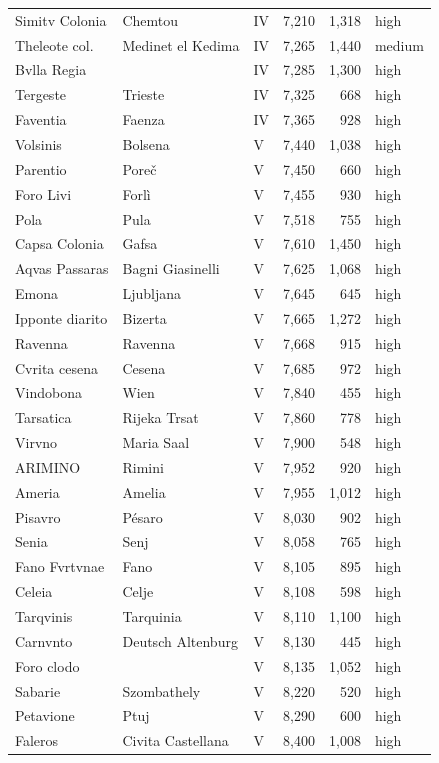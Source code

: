 \documentclass[11pt,a4paper]{article}
\begin{document}
{\begin{longtable}{p{4.6cm}p{5.2cm}lrrl}
Simitv Colonia & Chemtou & IV & 7,210 & 1,318 & high\\
Theleote col. & Medinet el Kedima & IV & 7,265 & 1,440 & medium\\
Bvlla Regia &  & IV & 7,285 & 1,300 & high\\
Tergeste & Trieste & IV & 7,325 & 668 & high\\
Faventia & Faenza & IV & 7,365 & 928 & high\\
Volsinis & Bolsena & V & 7,440 & 1,038 & high\\
Parentio & Poreč & V & 7,450 & 660 & high\\
Foro Livi & Forlì & V & 7,455 & 930 & high\\
Pola & Pula & V & 7,518 & 755 & high\\
Capsa Colonia & Gafsa & V & 7,610 & 1,450 & high\\
Aqvas Passaras & Bagni Giasinelli & V & 7,625 & 1,068 & high\\
Emona & Ljubljana & V & 7,645 & 645 & high\\
Ipponte diarito & Bizerta & V & 7,665 & 1,272 & high\\
Ravenna & Ravenna & V & 7,668 & 915 & high\\
Cvrita cesena & Cesena & V & 7,685 & 972 & high\\
Vindobona & Wien & V & 7,840 & 455 & high\\
Tarsatica & Rijeka Trsat & V & 7,860 & 778 & high\\
Virvno & Maria Saal & V & 7,900 & 548 & high\\
ARIMINO & Rimini & V & 7,952 & 920 & high\\
Ameria & Amelia & V & 7,955 & 1,012 & high\\
Pisavro & Pésaro & V & 8,030 & 902 & high\\
Senia & Senj & V & 8,058 & 765 & high\\
Fano Fvrtvnae & Fano & V & 8,105 & 895 & high\\
Celeia & Celje & V & 8,108 & 598 & high\\
Tarqvinis & Tarquinia & V & 8,110 & 1,100 & high\\
Carnvnto & Deutsch Altenburg & V & 8,130 & 445 & high\\
Foro clodo &  & V & 8,135 & 1,052 & high\\
Sabarie & Szombathely & V & 8,220 & 520 & high\\
Petavione & Ptuj & V & 8,290 & 600 & high\\
Faleros & Civita Castellana & V & 8,400 & 1,008 & high\\

\end{longtable}}
\end{document}
